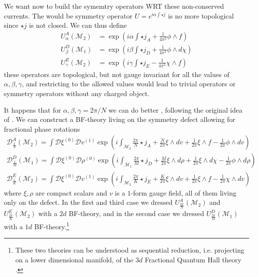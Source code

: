 \documentclass[aps,preprint,nofootinbib,preprintnumbers,eqsecnum,superscriptaddress]{revtex4}
\numberwithin{equation}{section}
\begin{document}
We want now to build the symemtry operators WRT these non-conserved currents. The would be symmetry operator $U=e^{i\alpha \int \star j}$ is no more topological since $\star j$ is not closed. We can thus define
\begin{align}
    U^A_\alpha (\mathcal{M}_2) &= \exp \left(  i \alpha \int \star j_A + \frac{1}{4 \pi^2} \phi \wedge f\right) \\
    U^D_\beta (\mathcal{M}_1) &= \exp \left(  i \beta \int \star j_D + \frac{1}{4 \pi^2} \phi \wedge d\chi \right) \\
    U^E_\gamma (\mathcal{M}_2) &= \exp \left(  i \gamma \int \star j_E - \frac{1}{4 \pi^2} \chi \wedge f \right)
\end{align}
these operators are topological, but not gauge invariant for all the values of $\alpha , \beta, \gamma$, and restricting to the allowed values would lead to trivial operators or symmetry operators without any charged object.

It happens that for $\alpha , \beta, \gamma = 2\pi / N$ we can do better \cite{Damia_2023}, following the original idea of \cite{choi2022noninvertibleglobalsymmetriesstandard, cordova2022noninvertiblechiralsymmetryexponential}. We can construct a BF-theory living on the symmetry defect allowing for fractional phase rotations
\begin{align}
    \mathcal{D}^A_{\frac{1}{N}} (\mathcal{M}_2) = \int \mathcal{D}\xi^{(0)} \mathcal{D}v^{(1)} \exp \left(  i  \int_{\mathcal{M}_2} \frac{2 \pi}{N} \star  j_A + \frac{N}{2 \pi} \xi \wedge dv + \frac{1}{2 \pi} \xi \wedge f - \frac{1}{2 \pi} \phi \wedge dv \right) \\
    \mathcal{D}^D_{\frac{1}{M}} (\mathcal{M}_1) = \int \mathcal{D}\xi^{(0)} \mathcal{D}\rho^{(0)} \exp \left(  i  \int_{\mathcal{M}_1} \frac{2 \pi}{M} \star  j_D + \frac{M}{2 \pi} \xi \wedge d\rho + \frac{1}{2 \pi} \xi \wedge d\chi - \frac{1}{2 \pi} \phi \wedge d\rho \right) \\
    \mathcal{D}^E_{\frac{1}{K}} (\mathcal{M}_2) = \int \mathcal{D}\xi^{(0)} \mathcal{D}v^{(1)} \exp \left(  i  \int_{\mathcal{M}_2} \frac{2 \pi}{K} \star  j_E + \frac{K}{2 \pi} \xi \wedge dv + \frac{1}{2 \pi} \xi \wedge f - \frac{1}{2 \pi} \chi \wedge dv \right)
\end{align}
where $\xi, \rho$ are compact scalars and $v$ is a $1$-form gauge field, all of them living only on the defect. In the first and third case we dressed $U^A_{\frac{2\pi}{N}} (\mathcal{M}_2)$ and $U^E_{\frac{2\pi}{K}} (\mathcal{M}_2)$ with a $2d$ BF-theory, and in the second case we dressed $U^D_{\frac{2\pi}{M}} (\mathcal{M}_1)$ with a $1d$ BF-theory.\footnote{These two theories can be understood as sequential reduction, i.e. projecting on a lower dimensional manifold, of the $3d$ Fractional Quantum Hall theory \cite{Damia_2023}.} 
\end{document}
